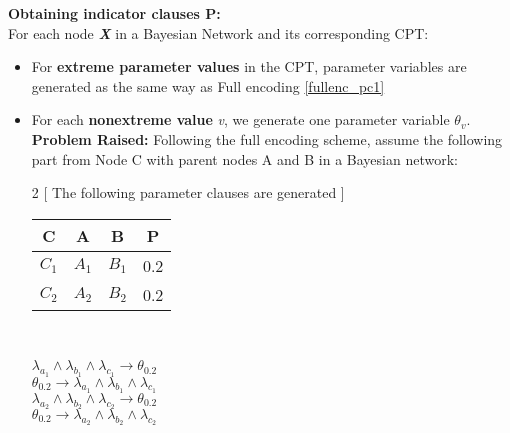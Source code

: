 \textbf{Obtaining indicator clauses \textsc{P}:}\\
For each node \textbf{\textit{X}} in a Bayesian Network and its corresponding CPT:
\begin{itemize}
    \item For \textbf{extreme parameter values} in the CPT, parameter variables are generated as the same way as Full encoding \ref{fullenc_pc1}
    \item For each \textbf{non\-extreme value} \textit{v}, we generate one parameter variable $\theta_{v}$.\\
\textbf{Problem Raised:} Following the full encoding scheme, assume the following part from Node C with parent nodes A and B in a Bayesian network:
\begin{multicols}{2}
[
The following parameter clauses are generated
]

\begin{center}
\vspace{10mm}
    \begin{tabular}{ c c c c } 
    \hline
    C & A & B & P\\
    \hline
    \hline
    $C_1$ & $A_1$ & $B_1$ & 0.2\\
    $C_2$ & $A_2$ & $B_2$ & 0.2\\
    \hline
    \end{tabular}\\ 
\end{center} 
\columnbreak
    
$\lambda_{a_{1}} \wedge \lambda_{b_{1}} \wedge \lambda_{c_{1}} \rightarrow \theta_{0.2}$\\
$ \theta_{0.2} \rightarrow \lambda_{a_{1}} \wedge \lambda_{b_{1}} \wedge \lambda_{c_{1}}$\\
$\lambda_{a_{2}} \wedge \lambda_{b_{2}} \wedge \lambda_{c_{2}} \rightarrow \theta_{0.2}$\\
$ \theta_{0.2} \rightarrow \lambda_{a_{2}} \wedge \lambda_{b_{2}} \wedge \lambda_{c_{2}}$\\
\end{multicols}


\end{itemize}
